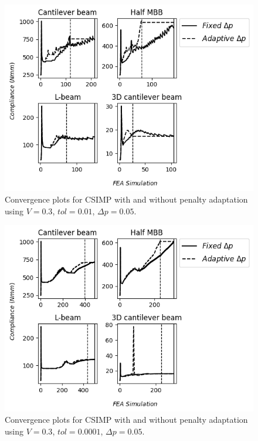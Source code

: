   \begin{figure}
    \centering
    \includegraphics[width=\textwidth]{images/adaptive_csimp/convplots_csimp_03_01_80_001_ip.png}
    \caption{Convergence plots for CSIMP with and without penalty adaptation using $V = 0.3$, $tol = 0.01$, $\Delta p = 0.05$.}
    \label{fig:reuse_convplots_high_tol}
  \end{figure}
  \begin{figure}
    \centering
    \includegraphics[width=\textwidth]{images/adaptive_csimp/convplots_csimp_03_0001_80_001_ip.png}
    \caption{Convergence plots for CSIMP with and without penalty adaptation using $V = 0.3$, $tol = 0.0001$, $\Delta p = 0.05$.}
    \label{fig:reuse_convplots_low_tol}
  \end{figure}

